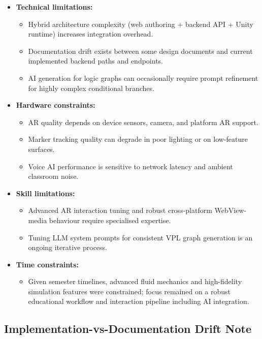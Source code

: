 \documentclass[12pt,a4paper]{article}
\begin{document}
\begin{itemize}[leftmargin=1.4cm]
  \item \textbf{Technical limitations:}
  \begin{itemize}
    \item Hybrid architecture complexity (web authoring + backend API + Unity runtime)
          increases integration overhead.
    \item Documentation drift exists between some design documents and current
          implemented backend paths and endpoints.
    \item AI generation for logic graphs can occasionally require prompt refinement for
          highly complex conditional branches.
  \end{itemize}
  \item \textbf{Hardware constraints:}
  \begin{itemize}
    \item AR quality depends on device sensors, camera, and platform AR support.
    \item Marker tracking quality can degrade in poor lighting or on low-feature surfaces.
    \item Voice AI performance is sensitive to network latency and ambient classroom noise.
  \end{itemize}
  \item \textbf{Skill limitations:}
  \begin{itemize}
    \item Advanced AR interaction tuning and robust cross-platform WebView-media behaviour
          require specialised expertise.
    \item Tuning LLM system prompts for consistent VPL graph generation is an ongoing
          iterative process.
  \end{itemize}
  \item \textbf{Time constraints:}
  \begin{itemize}
    \item Given semester timelines, advanced fluid mechanics and high-fidelity simulation
          features were constrained; focus remained on a robust educational workflow and
          interaction pipeline including AI integration.
  \end{itemize}
\end{itemize}

\subsection*{Implementation-vs-Documentation Drift Note}
\end{document}
